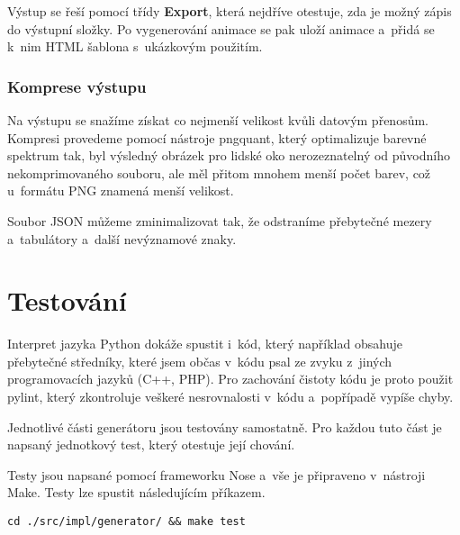 Výstup se řeší pomocí třídy \textbf{Export}, která nejdříve otestuje, zda je možný zápis do výstupní složky. Po vygenerování animace se pak uloží animace a~přidá se k~nim HTML šablona s~ukázkovým použitím.

\subsubsection*{Komprese výstupu}

Na výstupu se snažíme získat co nejmenší velikost kvůli datovým přenosům. Kompresi provedeme pomocí nástroje pngquant\cite{pngquant}, který optimalizuje barevné spektrum tak, byl výsledný obrázek pro lidské oko nerozeznatelný od původního nekomprimovaného souboru, ale měl přitom mnohem menší počet barev, což u~formátu PNG znamená menší velikost.

Soubor JSON můžeme zminimalizovat tak, že odstraníme přebytečné mezery a~tabulátory a~další nevýznamové znaky.

\section{Testování}

Interpret jazyka Python dokáže spustit i~kód, který například obsahuje přebytečné středníky, které jsem občas v~kódu psal ze zvyku z~jiných programovacích jazyků (C++, PHP). Pro zachování čistoty kódu je proto použit pylint\cite{pylint}, který zkontroluje veškeré nesrovnalosti v~kódu a~popřípadě vypíše chyby.

Jednotlivé části generátoru jsou testovány samostatně. Pro každou tuto část je napsaný jednotkový test, který otestuje její chování.

Testy jsou napsané pomocí frameworku Nose\cite{nose} a~vše je připraveno v~nástroji Make\cite{make}. Testy lze spustit následujícím příkazem.


\begin{lstlisting}
cd ./src/impl/generator/ && make test
\end{lstlisting}

